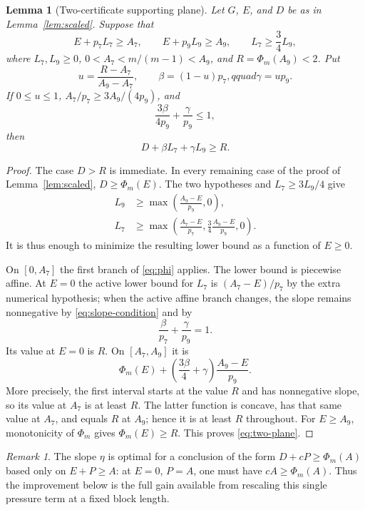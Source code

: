 \documentclass[11pt]{amsart}
\newtheorem{lemma}[theorem]{Lemma}
\theoremstyle{remark}
\newtheorem{remark}[theorem]{Remark}
\begin{document}
\begin{lemma}[Two-certificate supporting plane]\label{lem:two}
Let $G$, $E$, and $D$ be as in Lemma~\ref{lem:scaled}.  Suppose that
\[
 E+p_7L_7\ge A_7,\qquad E+p_9L_9\ge A_9,
 \qquad L_7\ge\frac34L_9,
\]
where $L_7,L_9\ge0$, $0<A_7<m/(m-1)<A_9$, and
$R=\Phi_m(A_9)<2$.  Put
\[
 u=\frac{R-A_7}{A_9-A_7},\qquad
 \beta=(1-u)p_7,qquad \gamma=up_9.
\]
If $0\le u\le1$, $A_7/p_7\ge3A_9/(4p_9)$, and
\begin{equation}\label{eq:slope-condition}
 \frac{3\beta}{4p_9}+\frac{\gamma}{p_9}\le1,
\end{equation}
then
\begin{equation}\label{eq:two-plane}
 D+\beta L_7+\gamma L_9\ge R.
\end{equation}
\end{lemma}

\begin{proof}
The case $D>R$ is immediate.  In every remaining case of the proof of
Lemma~\ref{lem:scaled}, $D\ge\Phi_m(E)$.  The two hypotheses and
$L_7\ge3L_9/4$ give
\begin{align*}
 L_9&\ge\max\!\left(\frac{A_9-E}{p_9},0\right),\\
 L_7&\ge
 \max\!\left(\frac{A_7-E}{p_7},
       \frac34\frac{A_9-E}{p_9},0\right).
\end{align*}
It is thus enough to minimize the resulting lower bound as a function of
$E\ge0$.

On $[0,A_7]$ the first branch of \eqref{eq:phi} applies.  The lower bound is
piecewise affine.  At $E=0$ the active lower bound for $L_7$ is
$(A_7-E)/p_7$ by the extra numerical hypothesis; when the active affine
branch changes, the slope remains nonnegative by
\eqref{eq:slope-condition} and by
\[
 \frac{\beta}{p_7}+\frac{\gamma}{p_9}=1.
\]
Its value at $E=0$ is $R$.  On $[A_7,A_9]$ it is
\[
 \Phi_m(E)+\left(\frac{3\beta}{4}+\gamma\right)
 \frac{A_9-E}{p_9}.
\]
More precisely, the first interval starts at the value $R$ and has
nonnegative slope, so its value at $A_7$ is at least $R$.  The latter
function is concave, has that same value at $A_7$, and equals $R$ at $A_9$;
hence it is at least $R$ throughout.  For $E\ge A_9$, monotonicity of
$\Phi_m$ gives $\Phi_m(E)\ge R$.  This proves \eqref{eq:two-plane}.
\end{proof}

\begin{remark}
The slope $\eta$ is optimal for a conclusion of the form
$D+cP\ge\Phi_m(A)$ based only on $E+P\ge A$: at $E=0$, $P=A$, one must have
$cA\ge\Phi_m(A)$.  Thus the improvement below is the full gain available
from rescaling this single pressure term at a fixed block length.
\end{remark}
\end{document}
